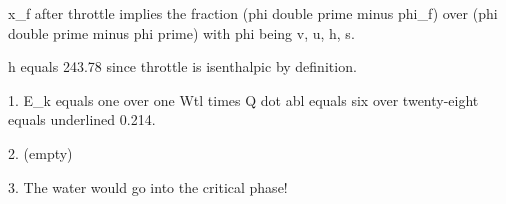 x_f after throttle implies the fraction (phi double prime minus phi_f) over (phi double prime minus phi prime) with phi being v, u, h, s.

h equals 243.78 since throttle is isenthalpic by definition.

1. E_k equals one over one Wtl times Q dot abl equals six over twenty-eight equals underlined 0.214.

2. (empty)

3. The water would go into the critical phase!